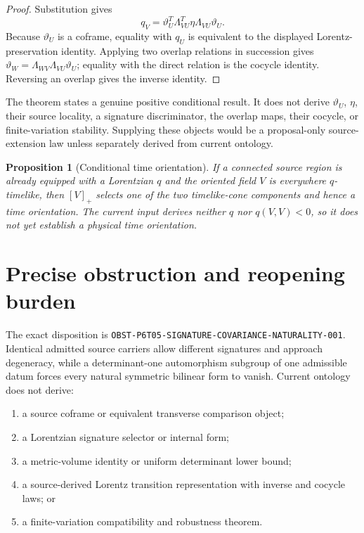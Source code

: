 \documentclass[11pt]{article}
\newtheorem{proposition}[theorem]{Proposition}
\begin{document}
\begin{proof}
Substitution gives
\[
 q_V=\vartheta_U^T\Lambda_{VU}^T\eta\Lambda_{VU}\vartheta_U.
\]
Because \(\vartheta_U\) is a coframe, equality with \(q_U\) is equivalent to
the displayed Lorentz-preservation identity. Applying two overlap relations
in succession gives
\(\vartheta_W=\Lambda_{WV}\Lambda_{VU}\vartheta_U\); equality with the direct
relation is the cocycle identity. Reversing an overlap gives the inverse
identity.
\end{proof}

The theorem states a genuine positive conditional result. It does not derive
\(\vartheta_U\), \(\eta\), their source locality, a signature discriminator,
the overlap maps, their cocycle, or finite-variation stability. Supplying
these objects would be a proposal-only source-extension law unless separately
derived from current ontology.

\begin{proposition}[Conditional time orientation]
If a connected source region is already equipped with a Lorentzian \(q\) and
the oriented field \(V\) is everywhere \(q\)-timelike, then \([V]_+\)
selects one of the two timelike-cone components and hence a time orientation.
The current input derives neither \(q\) nor \(q(V,V)<0\), so it does not yet
establish a physical time orientation.
\end{proposition}

\section{Precise obstruction and reopening burden}

The exact disposition is
\texttt{OBST-P6T05-SIGNATURE-COVARIANCE-NATURALITY-001}. Identical admitted
source carriers allow different signatures and approach degeneracy, while a
determinant-one automorphism subgroup of one admissible datum forces every
natural symmetric bilinear form to vanish. Current ontology does not derive:
\begin{enumerate}
\item a source coframe or equivalent transverse comparison object;
\item a Lorentzian signature selector or internal form;
\item a metric-volume identity or uniform determinant lower bound;
\item a source-derived Lorentz transition representation with inverse and
cocycle laws; or
\item a finite-variation compatibility and robustness theorem.
\end{enumerate}
\end{document}

